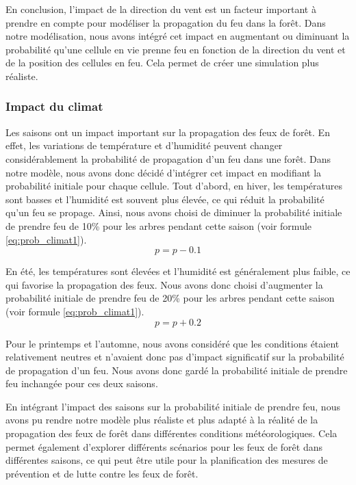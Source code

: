 En conclusion, l'impact de la direction du vent est un facteur important à prendre en compte pour modéliser la propagation du feu dans la forêt. Dans notre modélisation, nous avons intégré cet impact en augmentant ou diminuant la probabilité qu'une cellule en vie prenne feu en fonction de la direction du vent et de la position des cellules en feu. Cela permet de créer une simulation plus réaliste.

\subsubsection{ Impact du climat}

Les saisons ont un impact important sur la propagation des feux de forêt. En effet, les variations de température et d'humidité peuvent changer considérablement la probabilité de propagation d'un feu dans une forêt. Dans notre modèle, nous avons donc décidé d'intégrer cet impact en modifiant la probabilité initiale pour chaque cellule.
Tout d'abord, en hiver, les températures sont basses et l'humidité est souvent plus élevée, ce qui réduit la probabilité qu'un feu se propage. Ainsi, nous avons choisi de diminuer la probabilité initiale de prendre feu de 10\% pour les arbres pendant cette saison (voir formule \ref{eq:prob_climat1}).
\begin{equation}
    p = p - 0.1
    \label{eq:prob_climat1}
\end{equation}

En été, les températures sont élevées et l'humidité est généralement plus faible, ce qui favorise la propagation des feux. Nous avons donc choisi d'augmenter la probabilité initiale de prendre feu de 20\% pour les arbres pendant cette saison (voir formule \ref{eq:prob_climat1}).
\begin{equation}
    p = p + 0.2
    \label{eq:prob_climat2}
\end{equation}

Pour le printemps et l'automne, nous avons considéré que les conditions étaient relativement neutres et n'avaient donc pas d'impact significatif sur la probabilité de propagation d'un feu. Nous avons donc gardé la probabilité initiale de prendre feu inchangée pour ces deux saisons.

En intégrant l'impact des saisons sur la probabilité initiale de prendre feu, nous avons pu rendre notre modèle plus réaliste et plus adapté à la réalité de la propagation des feux de forêt dans différentes conditions météorologiques. Cela permet également d'explorer différents scénarios pour les feux de forêt dans différentes saisons, ce qui peut être utile pour la planification des mesures de prévention et de lutte contre les feux de forêt.

